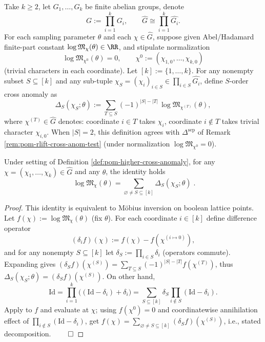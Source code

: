 \begin{definition}\label{def:pom-higher-cross-anomaly}
Take \(k\ge 2\), let \(G_1,\dots,G_k\) be finite abelian groups, denote
\[
G:=\prod_{i=1}^k G_i,
\qquad
\widehat G\cong \prod_{i=1}^k \widehat{G_i}.
\]
For each sampling parameter \(\theta\) and each \(\chi\in\widehat G\), suppose given Abel/Hadamard finite-part constant \(\log\mathfrak{M}_{\chi}(\theta)\in\RR\), and stipulate normalization
\[
\log\mathfrak{M}_{\chi^0}(\theta)=0,
\qquad
\chi^0:=(\chi_{1,0},\dots,\chi_{k,0})
\]
(trivial characters in each coordinate).
Let \([k]:=\{1,\dots,k\}\).
For any nonempty subset \(S\subseteq[k]\) and any sub-tuple \(\chi_S=(\chi_i)_{i\in S}\in\prod_{i\in S}\widehat{G_i}\), define \(S\)-order cross anomaly as
\[
\Delta_S(\chi_S;\theta)
:=\sum_{T\subseteq S}(-1)^{|S|-|T|}\,\log\mathfrak{M}_{\chi^{(T)}}(\theta),
\]
where \(\chi^{(T)}\in\widehat G\) denotes: coordinate \(i\in T\) takes \(\chi_i\), coordinate \(i\notin T\) takes trivial character \(\chi_{i,0}\).
When \(|S|=2\), this definition agrees with \(\Delta^{\mathrm{sep}}\) of Remark \ref{rem:pom-rlift-cross-anom-test} (under normalization \(\log\mathfrak{M}_{\chi^0}=0\)).
\end{definition}

\begin{theorem}\label{thm:pom-mobius-complete-decomposition}
Under setting of Definition \ref{def:pom-higher-cross-anomaly}, for any \(\chi=(\chi_1,\dots,\chi_k)\in\widehat G\) and any \(\theta\), the identity holds
\[
\boxed{\;
\log\mathfrak{M}_\chi(\theta)
=\sum_{\varnothing\neq S\subseteq[k]}\Delta_S(\chi_S;\theta)\; }.
\]
\end{theorem}
\begin{proof}
This identity is equivalent to Möbius inversion on boolean lattice points.
Let \(f(\chi):=\log\mathfrak{M}_\chi(\theta)\) (fix \(\theta\)).
For each coordinate \(i\in[k]\) define difference operator
\[
(\delta_i f)(\chi):=f(\chi)-f(\chi^{(i\mapsto 0)}),
\]
and for any nonempty \(S\subseteq[k]\) let \(\delta_S:=\prod_{i\in S}\delta_i\) (operators commute).
Expanding gives
\(
(\delta_S f)(\chi^{(S)})=\sum_{T\subseteq S}(-1)^{|S|-|T|}f(\chi^{(T)})
\),
thus \(\Delta_S(\chi_S;\theta)=(\delta_S f)(\chi^{(S)})\).
On other hand,
\[
\mathrm{Id}=\prod_{i=1}^k\bigl((\mathrm{Id}-\delta_i)+\delta_i\bigr)
=\sum_{S\subseteq[k]}\delta_S\prod_{i\notin S}(\mathrm{Id}-\delta_i).
\]
Apply to \(f\) and evaluate at \(\chi\); using \(f(\chi^0)=0\) and coordinatewise annihilation effect of \(\prod_{i\notin S}(\mathrm{Id}-\delta_i)\), get
\(
f(\chi)=\sum_{\varnothing\neq S\subseteq[k]}(\delta_S f)(\chi^{(S)})
\),
i.e., stated decomposition. $\qed$
\end{proof}

